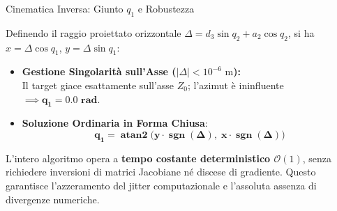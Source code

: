 \documentclass[aspectratio=169, 10pt]{beamer}
\DeclareMathOperator{\atanTwo}{atan2}
\DeclareMathOperator{\sgn}{sgn}
\begin{document}
\begin{frame}{Cinematica Inversa: Giunto $q_1$ e Robustezza}
    \begin{tcolorbox}[moderncard, title={\color{UniPgNavy}3. Giunto Azimutale di Base ($q_1$)}]
        \small
        Definendo il raggio proiettato orizzontale $\Delta = d_3 \sin q_2 + a_2 \cos q_2$, si ha $x = \Delta \cos q_1$, $y = \Delta \sin q_1$:
        \begin{itemize}
            \setlength{\itemsep}{2.5pt}
            \item \textbf{Gestione Singolarità sull'Asse ($|\Delta| < 10^{-6}\text{ m}$):}\\
            Il target giace esattamente sull'asse $Z_0$; l'azimut è ininfluente $\implies \mathbf{q_1 = 0.0\text{ rad}}$.
            \item \textbf{Soluzione Ordinaria in Forma Chiusa}:
            \[
                \mathbf{q_1 = \atanTwo\big(y \cdot \sgn(\Delta), \; x \cdot \sgn(\Delta)\big)}
            \]
        \end{itemize}
    \end{tcolorbox}

    \vspace{0.14cm}

    \begin{tcolorbox}[moderncard, title={\color{TechCyan}Determinismo e Stabilità Numerica $\mathcal{O}(1)$}]
        \small
        L'intero algoritmo opera a \textbf{tempo costante deterministico $\mathcal{O}(1)$}, senza richiedere inversioni di matrici Jacobiane né discese di gradiente.
        Questo garantisce l'azzeramento del jitter computazionale e l'assoluta assenza di divergenze numeriche.
    \end{tcolorbox}
\end{frame}
\end{document}
